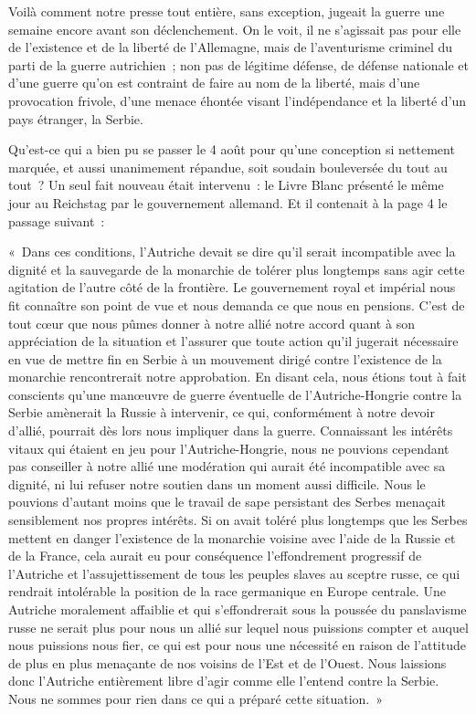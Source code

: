 \documentclass[french,twoside]{book} %
\newenvironment{quoteblock}%
  {\begin{quoting}}
  {\end{quoting}}
\newenvironment{quotebar}{%
    \def\FrameCommand{{\color{rubric!10!}\vrule width 0.5em} \hspace{0.9em}}%
    \def\OuterFrameSep{\itemsep} %
    \MakeFramed {\advance\hsize-\width \FrameRestore}
  }%
  {%
    \endMakeFramed
  }
\renewenvironment{quoteblock}%
  {%
    \savenotes
    \setstretch{0.9}
    \normalfont
    \begin{quotebar}
  }
  {%
    \end{quotebar}
    \spewnotes
  }
\begin{document}
\noindent Voilà comment notre presse tout entière, sans exception, jugeait la guerre une semaine encore avant son déclenchement. On le voit, il ne s’agissait pas pour elle de l’existence et de la liberté de l’Allemagne, mais de l’aventurisme criminel du parti de la guerre autrichien ; non pas de légitime défense, de défense nationale et d’une guerre qu’on est contraint de faire au nom de la liberté, mais d’une provocation frivole, d’une menace éhontée visant l’indépendance et la liberté d’un pays étranger, la Serbie.\par
Qu'est-ce qui a bien pu se passer le 4 août pour qu’une conception si nettement marquée, et aussi unanimement répandue, soit soudain bouleversée du tout au tout ? Un seul fait nouveau était intervenu : le Livre Blanc présenté le même jour au Reichstag par le gouvernement allemand. Et il contenait à la page 4 le passage suivant :\par

\begin{quoteblock}
 \noindent   « Dans ces conditions, l’Autriche devait se dire qu’il serait incompatible avec la dignité et la sauvegarde de la monarchie de tolérer plus longtemps sans agir cette agitation de l’autre côté de la frontière. Le gouvernement royal et impérial nous fit connaître son point de vue et nous demanda ce que nous en pensions. C'est de tout cœur que nous pûmes donner à notre allié notre accord quant à son appréciation de la situation et l’assurer que toute action qu’il jugerait nécessaire en vue de mettre fin en Serbie à un mouvement dirigé contre l’existence de la monarchie rencontrerait notre approbation. En disant cela, nous étions tout à fait conscients qu’une manœuvre de guerre éventuelle de l’Autriche-Hongrie contre la Serbie amènerait la Russie à intervenir, ce qui, conformément à notre devoir d’allié, pourrait dès lors nous impliquer dans la guerre. Connaissant les intérêts vitaux qui étaient en jeu pour l’Autriche-Hongrie, nous ne pouvions cependant pas conseiller à notre allié une modération qui aurait été incompatible avec sa dignité, ni lui refuser notre soutien dans un moment aussi difficile. Nous le pouvions d’autant moins que le travail de sape persistant des Serbes menaçait sensiblement nos propres intérêts. Si on avait toléré plus longtemps que les Serbes mettent en danger l’existence de la monarchie voisine avec l’aide de la Russie et de la France, cela aurait eu pour conséquence l’effondrement progressif de l’Autriche et l’assujettissement de tous les peuples slaves au sceptre russe, ce qui rendrait intolérable la position de la race germanique en Europe centrale. Une Autriche moralement affaiblie et qui s’effondrerait sous la poussée du panslavisme russe ne serait plus pour nous un allié sur lequel nous puissions compter et auquel nous puissions nous fier, ce qui est pour nous une nécessité en raison de l’attitude de plus en plus menaçante de nos voisins de l’Est et de l’Ouest. Nous laissions donc l’Autriche entièrement libre d’agir comme elle l’entend contre la Serbie. Nous ne sommes pour rien dans ce qui a préparé cette situation. »
\end{quoteblock}
\end{document}
